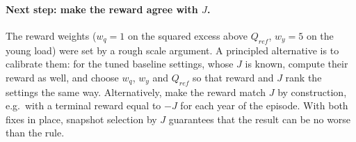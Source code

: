 \paragraph{Next step: make the reward agree with $J$.} The reward weights
($w_q=1$ on the squared excess above $Q_{ref}$, $w_y=5$ on the young load)
were set by a rough scale argument. A principled alternative is to
calibrate them: for the tuned baseline settings, whose $J$ is known,
compute their reward as well, and choose $w_q$, $w_y$ and $Q_{ref}$ so that
reward and $J$ rank the settings the same way. Alternatively, make the
reward match $J$ by construction, e.g.\ with a terminal reward equal to
$-J$ for each year of the episode. With both fixes in place, snapshot
selection by $J$ guarantees that the result can be no worse than the rule.
